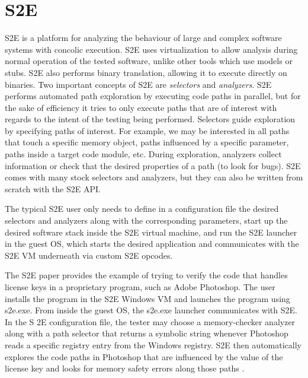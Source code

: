 \documentclass[11pt]{article}
\begin{document}
\section{S2E}
S2E is a platform for analyzing the behaviour of large and complex software
systems with concolic execution. S2E uses virtualization to allow
analysis during normal operation of the tested software, unlike other tools
which use models or stubs. S2E also performs binary translation, allowing it to
execute directly on binaries. Two important concepts of S2E
are \textit{selectors} and \textit{analyzers}. S2E performs automated path exploration by executing
code paths in parallel, but for the sake of efficiency it tries to only execute
paths that are of interest with regards to the intent of the testing being
performed. Selectors guide exploration by specifying paths of interest. For
example, we may be interested in all paths that touch a specific memory object,
paths influenced by a specific parameter, paths inside a target code module,
etc. During exploration, analyzers collect information or check that the desired
properties of a path (to look for bugs). S2E comes with many stock selectors and
analyzers, but they can also be written from scratch with the S2E API. \par
The typical S2E user only needs to define in a configuration file the desired
selectors and analyzers along with the corresponding parameters, start up the
desired software stack inside the S2E virtual machine, and run the S2E launcher
in the guest OS, which starts the desired application and communicates with the
S2E VM underneath via custom S2E opcodes. \par
The S2E paper provides the example of trying to verify the code that handles
license keys in a proprietary program, such as Adobe Photoshop. The user
installs the program in the S2E Windows VM and launches the program using
s2e.exe. From inside the guest OS, the s2e.exe
launcher communicates with S2E. In the S
2E configuration file, the tester may choose a memory-checker analyzer along
with a path selector that returns a symbolic string whenever Photoshop reads
a specific registry entry from the Windows registry. S2E
then automatically explores the code paths in Photoshop that are influenced by
the value of the license key and looks for memory safety errors along those 
paths \cite{s2e}. \par
\end{document}
